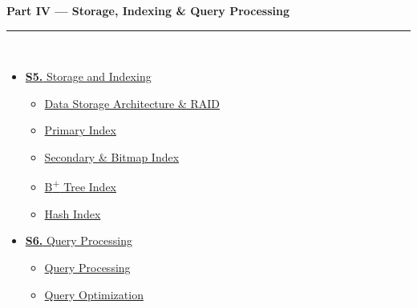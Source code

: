 \documentclass[12pt,a3paper]{article}
\begin{document}
\begin{tcolorbox}[breakable,colback=cD!5,colframe=cD,boxrule=1pt,arc=5pt,
  left=8pt,right=8pt,top=8pt,bottom=8pt,before skip=4pt]
  {\large\bfseries\textcolor{cD}{Part IV --- Storage, Indexing \& Query Processing}}\\[5pt]
  \textcolor{cD!40}{\rule{\textwidth}{0.4pt}}\\[3pt]
  \small\begin{itemize}[leftmargin=1.2em,itemsep=1pt,label={\textcolor{cD}{$\triangleright$}}]
    \item \hyperref[sec:S5]{\textbf{S5.} Storage and Indexing}
      \begin{itemize}[leftmargin=1.5em,itemsep=0pt,label={\textcolor{cD}{$\cdot$}}]
        \item \hyperref[sub:s5-storage]{Data Storage Architecture \& RAID}
        \item \hyperref[sub:s5-primary]{Primary Index}
        \item \hyperref[sub:s5-secondary]{Secondary \& Bitmap Index}
        \item \hyperref[sub:s5-btree]{B\textsuperscript{+} Tree Index}
        \item \hyperref[sub:s5-hash]{Hash Index}
      \end{itemize}
    \item \hyperref[sec:S6]{\textbf{S6.} Query Processing}
      \begin{itemize}[leftmargin=1.5em,itemsep=0pt,label={\textcolor{cD}{$\cdot$}}]
        \item \hyperref[sub:s6-qp]{Query Processing}
        \item \hyperref[sub:s6-qo]{Query Optimization}
      \end{itemize}
  \end{itemize}
\end{tcolorbox}
\end{document}
